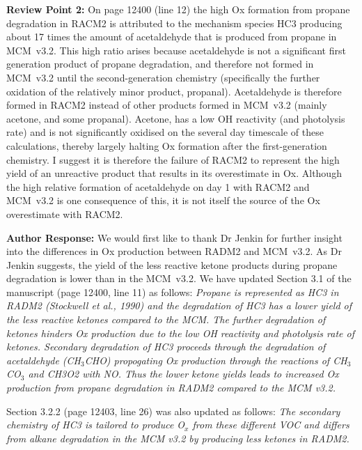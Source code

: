 \documentclass{article}
\begin{document}
\textbf{Review Point 2:} On page 12400 (line 12) the high Ox formation from propane degradation in RACM2 is attributed to the mechanism species HC3 producing about 17 times the amount of acetaldehyde that is produced from propane in MCM~v3.2. This high ratio arises because acetaldehyde is not a significant first generation product of propane degradation, and therefore not formed in MCM~v3.2 until the second-generation chemistry (specifically the further oxidation of the relatively minor product, propanal). Acetaldehyde is therefore formed in RACM2 instead of other products formed in MCM~v3.2 (mainly acetone, and some propanal). Acetone, has a low OH reactivity (and photolysis rate) and is not significantly oxidised on the several day timescale of these calculations, thereby largely halting Ox formation after the first-generation chemistry. I suggest it is therefore the failure of RACM2 to represent the high yield of an unreactive product that results in its overestimate in Ox. Although the high relative formation of acetaldehyde on day 1 with RACM2 and MCM~v3.2 is one consequence of this, it is not itself the source of the Ox overestimate with RACM2.

\textbf{Author Response:} We would first like to thank Dr Jenkin for further insight into the differences in Ox production between RADM2 and MCM~v3.2. 
As Dr Jenkin suggests, the yield of the less reactive ketone products during propane degradation is lower than in the MCM~v3.2.
We have updated Section 3.1 of the manuscript (page 12400, line 11) as follows:
\textit{ Propane is represented as HC3 in RADM2 (Stockwell et al., 1990) and the degradation of HC3 has a lower yield of the less reactive ketones compared to the MCM. The further degradation of ketones hinders Ox production due to the low OH reactivity and photolysis rate of ketones. Secondary degradation of HC3 proceeds through the degradation of acetaldehyde (CH$_3$CHO) propogating Ox production through the reactions of CH$_3$CO$_3$ and CH3O2 with NO. Thus the lower ketone yields leads to increased Ox production from propane degradation in RADM2 compared to the MCM v3.2.}

Section 3.2.2 (page 12403, line 26) was also updated as follows:
\textit{The secondary chemistry of HC3 is tailored to produce O$_{x}$ from these different VOC and differs from alkane degradation in the MCM v3.2 by producing less ketones in RADM2.}
\end{document}
